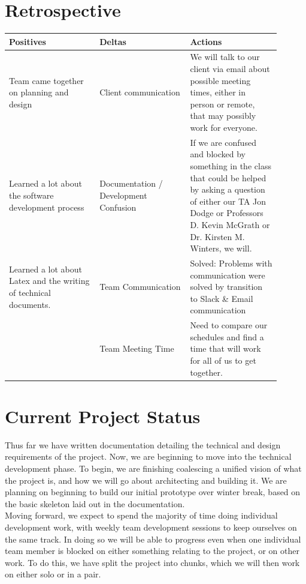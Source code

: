\documentclass[onecolumn, draftclsnofoot,10pt, compsoc]{IEEEtran}
\begin{document}
\section{Retrospective}

\begin{tabular}{|p{0.3\linewidth}||p{0.3\linewidth}|p{0.3\linewidth}|}
\hline
Positives & Deltas & Actions \\ \hline

Team came together on planning and design &
Client communication &
We will talk to our client via email about possible meeting times, either in person or remote, that may possibly work for everyone. \\ \hline

Learned a lot about the software development process &
Documentation / Development Confusion &
If we are confused and blocked by something in the class that could be helped by asking a question of either our TA Jon Dodge or Professors D. Kevin McGrath or Dr. Kirsten M. Winters, we will. \\[0.000001cm] \hline

Learned a lot about Latex and the writing of technical documents. &
Team Communication &
Solved: Problems with communication were solved by transition to Slack \& Email communication \\[1pt]  \hline

&
Team Meeting Time &
Need to compare our schedules and find a time that will work for all of us to get together. \\ \hline

\hline
\end{tabular}

\section{Current Project Status}

Thus far we have written documentation detailing the technical and design requirements of the project.
Now, we are beginning to move into the technical development phase.
To begin, we are finishing coalescing a unified vision of what the project is, and how we will go about architecting and building it.
We are planning on beginning to build our initial prototype over winter break, based on the basic skeleton laid out in the documentation. \\

\noindent Moving forward, we expect to spend the majority of time doing individual development work, with weekly team development sessions to keep ourselves on the same track.
In doing so we will be able to progress even when one individual team member is blocked on either something relating to the project, or on other work.
To do this, we have split the project into chunks, which we will then work on either solo or in a pair. 
\end{document}
